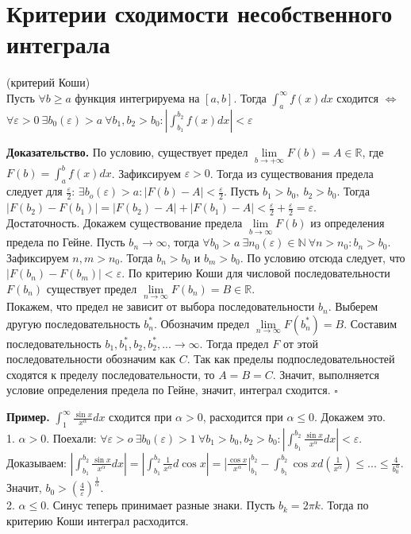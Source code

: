 \section{Критерии сходимости несобственного интеграла}
\begin{theor} (критерий Коши)\\
    Пусть $\forall b\geqslant a$ функция интегрируема на $[a,b]$. 
    Тогда $\int_a^\infty f(x)dx$ сходится $\Leftrightarrow$ $\forall 
    \varepsilon>0~\exists b_0(\varepsilon)>a~\forall b_1,b_2>b_0:
    \left| \int_{b_1}^{b_2}f(x)dx \right|<\varepsilon$
\end{theor}
\textbf{Доказательство.} По условию, существует предел 
$\lim\limits_{b \to +\infty} F(b)=A\in \mathbb{R}$, где
$F(b)=\int^b_af(x)dx$. 
Зафиксируем $\varepsilon>0$. Тогда из существования предела следует
для $\frac{\varepsilon}{2}$: $\exists b_o(\varepsilon)>a:\left| 
F(b)-A\right|<\frac{\varepsilon}{2}$. Пусть $b_1>b_0,~b_2>b_0$. Тогда
$|F(b_2)-F(b_1)|=|F(b_2)-A|+|F(b_1)-A|<\frac{\varepsilon}{2}+
\frac{\varepsilon}{2}=\varepsilon$.\\
Достаточность. Докажем существование предела  $\lim\limits_{b\to\infty}F(b)$
из определения предела по Гейне. Пусть $b_n\to \infty$, тогда $\forall b_0>a
~\exists n_0(\varepsilon)\in \mathbb{N}~\forall n>n_0:b_n>b_0$. 
Зафиксируем $n,m>n_0$. Тогда $b_n>b_0$ и $b_m>b_0$. По условию отсюда 
следует, что $|F(b_n)-F(b_m)|<\varepsilon$. По критерию Коши для числовой 
последовательности $F(b_n)$ существует предел 
$\lim\limits_{n \to \infty} F(b_n)=B\in \mathbb{R}$.\\
Покажем, что предел не зависит от выбора последовательности $b_n$. 
Выберем другую последовательность  $b^*_n$. Обозначим предел 
$\lim\limits_{n \to \infty} F(b^*_n)=B$. Составим последовательность
$b_1,b^*_1,b_2,b^*_2,...\to \infty$. Тогда предел $F$ от этой
последовательности обозначим как  $C$. Так как пределы подпоследовательностей 
сходятся к пределу последовательности, то  $A=B=C$. Значит, выполняется
условие определения предела по Гейне, значит, интеграл сходится. $\square$

\textbf{Пример.} $\int_1^\infty \frac{\sin x}{x^\alpha}dx$ сходится при 
$\alpha>0$, расходится при $\alpha\leqslant 0$. Докажем это.\\
1. $\alpha>0$. Поехали: $\forall \varepsilon>o~\exists b_0(\varepsilon)>1~
\forall b_1>b_0,b_2>b_0: \left| \int^{b_2}_{b_1} \frac{\sin x}{x^\alpha}dx
\right|<\varepsilon$. Доказываем: 
$\left| \int^{b_2}_{b_1} \frac{\sin x}{x^\alpha}dx
\right|=\left| \int^{b_2}_{b_1} \frac{1}{x^\alpha}d\cos x\right|=
\left| \frac{\cos x}{x^\alpha} \right|^{b_2}_{b_1}-\int^{b_2}_{b_1} 
\cos x d(\frac{1}{x^\alpha})\leqslant ... \leqslant\frac{4}{b^\alpha_0}$.
Значит, $b_0>(\frac{4}{\varepsilon})^\frac{1}{\alpha}$.\\
2. $\alpha\leqslant 0$. Синус теперь принимает разные знаки. Пусть 
$b_k=2\pi k$. Тогда по критерию Коши интеграл расходится.

